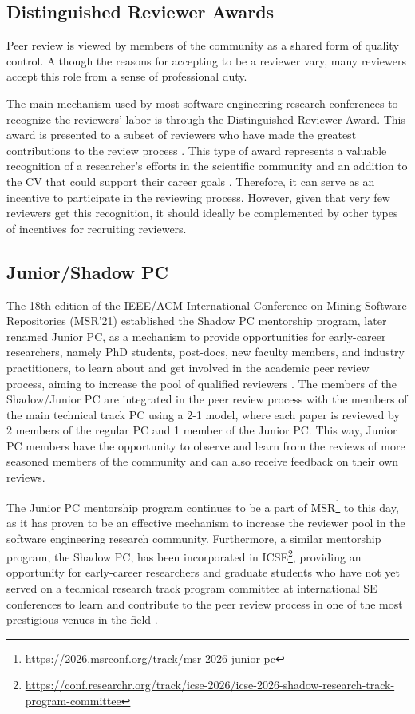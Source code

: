 \documentclass[sigconf]{acmart}
\begin{document}
\subsection {Distinguished Reviewer Awards}

Peer review is viewed by members of the community as a shared form of quality control. Although the reasons for accepting to be a reviewer vary, many reviewers accept this role from a sense of professional duty. 

The main mechanism used by most software engineering research conferences to recognize the reviewers' labor is through the Distinguished Reviewer Award. This award is presented to a subset of reviewers who have made the greatest contributions to the review process \cite{Trinkenreich2025}. This type of award represents a valuable recognition of a researcher's efforts in the scientific community and an addition to the CV that could support their career goals \cite{Trinkenreich2025}. Therefore, it can serve as an incentive to participate in the reviewing process. However, given that very few reviewers get this recognition, it should ideally be complemented by other types of incentives for recruiting reviewers. 

\subsection {Junior/Shadow PC}

The 18th edition of the IEEE/ACM International Conference on Mining Software Repositories (MSR'21) established the Shadow PC mentorship program, later renamed Junior PC, as a mechanism to provide opportunities for early-career researchers, namely PhD students, post-docs, new faculty members, and industry practitioners, to learn about and get involved in the academic peer review process, aiming to increase the pool of qualified reviewers \cite{Thongtanunam2021}. The members of the Shadow/Junior PC are integrated in the peer review process with the members of the main technical track PC using a 2-1 model, where each paper is reviewed by 2 members of the regular PC and 1 member of the Junior PC. This way, Junior PC members have the opportunity to observe and learn from the reviews of more seasoned members of the community and can also receive feedback on their own reviews. 

The Junior PC mentorship program continues to be a part of MSR\footnote{\url{https://2026.msrconf.org/track/msr-2026-junior-pc}} to this day, as it has proven to be an effective mechanism to increase the reviewer pool in the software engineering research community. Furthermore, a similar mentorship program, the Shadow PC, has been incorporated in ICSE\footnote{\url{https://conf.researchr.org/track/icse-2026/icse-2026-shadow-research-track-program-committee}}, providing an opportunity for early-career researchers and graduate students who have not yet served on a technical research track program committee at international SE conferences to learn and contribute to the peer review process in one of the most prestigious venues in the field \cite{Varghese2024}. 
\end{document}
